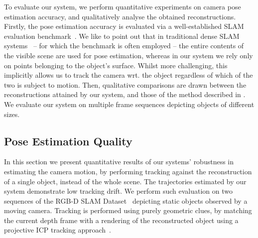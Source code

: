 To evaluate our system, we perform quantitative experiments on camera pose estimation accuracy, and qualitatively analyse the obtained reconstructions.
Firstly, the pose estimation accuracy is evaluated via a well-established SLAM evaluation benchmark~\cite{sturm12iros}.
We like to point out that %
in traditional dense SLAM systems~\cite{Prisacariu2014,Niessner2013,Newcombe2011} -- for which the benchmark is often employed -- the entire contents of the visible scene are used for pose estimation, whereas in our system we rely only on points belonging to the object's surface.
Whilst more challenging, this implicitly allows us to track the camera wrt. the object regardless of which of the two is subject to motion.
Then, qualitative comparisons are drawn between the reconstructions attained by our system, and those of the method described in \cite{Ren2013}.
We evaluate our system on multiple frame sequences depicting objects of different sizes. %


\subsection{Pose Estimation Quality}
In this section we present quantitative results of our systems' %
robustness in estimating the camera motion, by performing tracking against the reconstruction of a single object, instead of the whole scene.
The trajectories estimated by our system demonstrate low tracking drift. %
We perform such evaluation on two sequences of the RGB-D SLAM Dataset~\cite{sturm12iros} depicting static objects observed by a moving camera.
Tracking is performed using purely geometric clues, by matching the current depth frame with a rendering of the reconstructed object using a projective ICP tracking approach~\cite{Kahler2016}.

